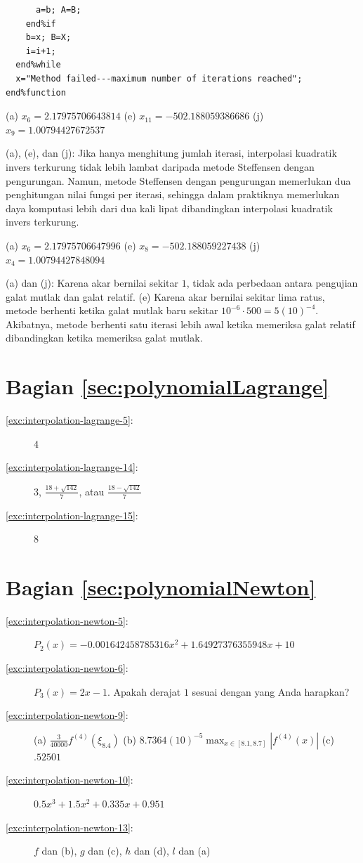 \begin{description}
\begin{verbatim}
      a=b; A=B;
    end%if
    b=x; B=X;
    i=i+1;
  end%while
  x="Method failed---maximum number of iterations reached";
end%function 
\end{verbatim}
\item [{\ref{exc:bracketing-9}:}] (a) $x_{6}=2.17975706643814$ (e) $x_{11}=-502.188059386686$
(j) $x_{9}=1.00794427672537$
\item [{\ref{exc:bracketing-13}:}] (a), (e), dan (j): Jika hanya menghitung
jumlah iterasi, interpolasi kuadratik invers terkurung tidak lebih
lambat daripada metode Steffensen dengan pengurungan. Namun, metode
Steffensen dengan pengurungan memerlukan dua penghitungan nilai fungsi
per iterasi, sehingga dalam praktiknya memerlukan daya komputasi lebih
dari dua kali lipat dibandingkan interpolasi kuadratik invers terkurung.
\item [{\ref{exc:bracketing-11}:}] (a) $x_{6}=2.17975706647996$ (e) $x_{8}=-502.188059227438$
(j) $x_{4}=1.00794427848094$
\item [{\ref{exc:bracketing-14}:}] (a) dan (j): Karena akar bernilai sekitar
$1$, tidak ada perbedaan antara pengujian galat mutlak dan galat
relatif. (e) Karena akar bernilai sekitar lima ratus, metode berhenti
ketika galat mutlak baru sekitar $10^{-6}\cdot500=5(10)^{-4}$. Akibatnya,
metode berhenti satu iterasi lebih awal ketika memeriksa galat relatif
dibandingkan ketika memeriksa galat mutlak.
\end{description}

\section*{Bagian \ref{sec:polynomialLagrange}}
\begin{description}
\item [{\ref{exc:interpolation-lagrange-5}:}] $4$
\item [{\ref{exc:interpolation-lagrange-14}:}] $3$, $\frac{18+\sqrt{142}}{7}$,
atau $\frac{18-\sqrt{142}}{7}$
\item [{\ref{exc:interpolation-lagrange-15}:}] $8$
\end{description}

\section*{Bagian \ref{sec:polynomialNewton}}
\begin{description}
\item [{\ref{exc:interpolation-newton-5}:}] $P_{2}(x)=-0.001642458785316x^{2}+1.64927376355948x+10$
\item [{\ref{exc:interpolation-newton-6}:}] $P_{3}(x)=2x-1$. Apakah derajat
$1$ sesuai dengan yang Anda harapkan?
\item [{\ref{exc:interpolation-newton-9}:}] (a) $\frac{3}{40000}f^{(4)}(\xi_{8.4})$
(b) $8.7364(10)^{-5}{\displaystyle \max_{x\in[8.1,8.7]}}\left|f^{(4)}(x)\right|$
(c) $.52501$ 
\item [{\ref{exc:interpolation-newton-10}:}] $0.5x^{3}+1.5x^{2}+0.335x+0.951$
\item [{\ref{exc:interpolation-newton-13}:}] $f$ dan (b), $g$ dan (c),
$h$ dan (d), $l$ dan (a)
\end{description}

